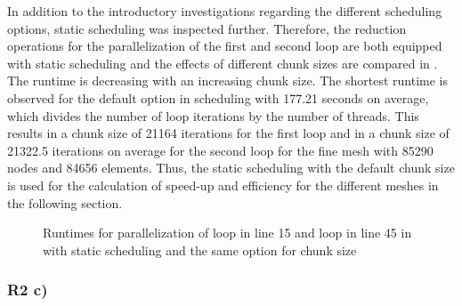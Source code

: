 In addition to the introductory investigations regarding the different scheduling options, static scheduling was inspected further. Therefore, the reduction operations for the parallelization of the first and second loop are both equipped with static scheduling and the effects of different chunk sizes are compared in . The runtime is decreasing with an increasing chunk size. The shortest runtime is observed for the default option in scheduling with 177.21 seconds on average, which divides the number of loop iterations by the number of threads. This results in a chunk size of 21164 iterations for the first loop and in a chunk size of 21322.5 iterations on average for the second loop for the fine mesh with 85290 nodes and 84656 elements. Thus, the static scheduling with the default chunk size is used for the calculation of speed-up and efficiency for the different meshes in the following section.

\begin{figure}[h!]
	\centering
	\caption{\label{fig::OpenMPStatic} Runtimes for parallelization of loop in line 15 and loop in line 45 in  with static scheduling and the same option for chunk size }
\end{figure}

\subsubsection{R2 c)}

